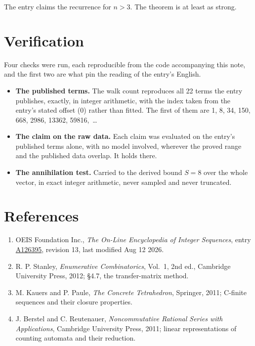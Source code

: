 \documentclass[11pt]{article}
\theoremstyle{definition}
\begin{document}
The entry claims the recurrence for $n > 3$. The theorem is at least as strong.

\section{Verification}

Four checks were run, each reproducible from the code accompanying this note, and the first two are what pin the reading of the entry's English.

\begin{itemize}

\item {\bfseries The published terms.} The walk count reproduces all 22 terms the entry publishes, exactly, in integer arithmetic, with the index taken from the entry's stated offset (0) rather than fitted. The first of them are 1, 8, 34, 150, 668, 2986, 13362, 59816,~\dots

\item {\bfseries The claim on the raw data.} Each claim was evaluated on the entry's published terms alone, with no model involved, wherever the proved range and the published data overlap. It holds there.

\item {\bfseries The annihilation test.} Carried to the derived bound $S = 8$ over the whole vector, in exact integer arithmetic, never sampled and never truncated.

\end{itemize}

\section{References}

\begin{enumerate}

\item OEIS Foundation Inc., \emph{The On-Line Encyclopedia of Integer Sequences}, entry \href{https://oeis.org/A126395}{A126395}, revision 13, last modified Aug 12 2026.

\item R. P. Stanley, \emph{Enumerative Combinatorics}, Vol.~1, 2nd ed., Cambridge University Press, 2012; \S4.7, the transfer-matrix method.

\item M. Kauers and P. Paule, \emph{The Concrete Tetrahedron}, Springer, 2011; C-finite sequences and their closure properties.

\item J. Berstel and C. Reutenauer, \emph{Noncommutative Rational Series with Applications}, Cambridge University Press, 2011; linear representations of counting automata and their reduction.

\end{enumerate}
\end{document}
